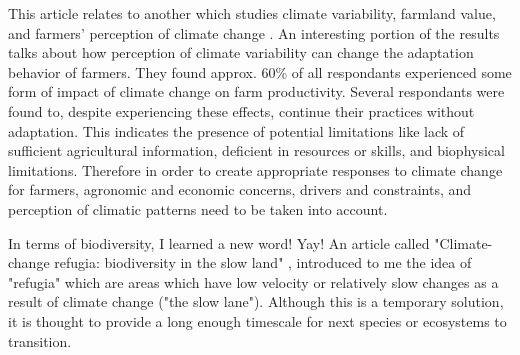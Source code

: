 \documentclass[a4paper,10pt]{article}
\begin{document}
This article relates to another which studies climate variability, farmland value, and farmers' perception of climate change \cite{arshad2017climate}. An interesting portion of the results talks about how perception of climate variability can change the adaptation behavior of farmers. They found approx. 60\% of all respondants experienced some form of impact of climate change on farm productivity. Several respondants were found to, despite experiencing these effects, continue their practices without adaptation. This indicates the presence of potential limitations like lack of sufficient agricultural information, deficient in resources or skills, and biophysical limitations. Therefore in order to create appropriate responses to climate change for farmers, agronomic and economic concerns, drivers and constraints, and perception of climatic patterns need to be taken into account.

In terms of biodiversity, I learned a new word! Yay! An article called "Climate-change refugia: biodiversity in the slow land" \cite{morelli2020climate}, introduced to me the idea of "refugia" which are areas which have low velocity or relatively slow changes as a result of climate change ("the slow lane"). Although this is a temporary solution, it is thought to provide a long enough timescale for next species or ecosystems to transition.



\end{document}
